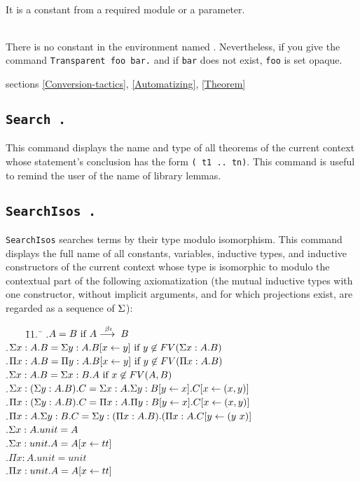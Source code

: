 \begin{ErrMsgs}
\item {}\\
    It is a constant from a required module or a parameter.
\item {\ident} \\
    There is no constant in the environment named
    \ident. Nevertheless, if you give the command \verb|Transparent foo bar.|
    and if \texttt{bar} does not exist, \texttt{foo} is set opaque.
\end{ErrMsgs}

\SeeAlso sections \ref{Conversion-tactics}, \ref{Automatizing},
\ref{Theorem}

\subsection{\tt Search {\ident}.}
This command displays the name and type of all theorems of the current
context whose statement's conclusion has the form {\tt ({\ident} t1 ..
  tn)}.  This command is useful to remind the user of the name of
library lemmas.

\subsection{\tt SearchIsos {\term}.}
\label{searchisos}
\texttt{SearchIsos} searches terms by their type modulo isomorphism.
This command displays the full name of all constants, variables,
inductive types, and inductive constructors of the current
context whose type is isomorphic to {\term} modulo the contextual part of the
following axiomatization (the mutual inductive types with one constructor,
without implicit arguments, and for which projections exist, are regarded as a
sequence of $\Sigma{}$):

\begin{tabbing}
\ \ \ \ \=11.\ \=\kill
{}.\>$A=B\mbox{ if }A\stackrel{\beta{}\iota{}}{\longrightarrow{}}B$\\
.\>$\Sigma{}x:A.B=\Sigma{}y:A.B[x\leftarrow{}y]\mbox{ if }y\not\in{}FV(\Sigma{}x:A.B)$\\
.\>$\Pi{}x:A.B=\Pi{}y:A.B[x\leftarrow{}y]\mbox{ if }y\not\in{}FV(\Pi{}x:A.B)$\\
.\>$\Sigma{}x:A.B=\Sigma{}x:B.A\mbox{ if }x\not\in{}FV(A,B)$\\
.\>$\Sigma{}x:(\Sigma{}y:A.B).C=\Sigma{}x:A.\Sigma{}y:B[y\leftarrow{}x].C[x\leftarrow{}(x,y)]$\\
.\>$\Pi{}x:(\Sigma{}y:A.B).C=\Pi{}x:A.\Pi{}y:B[y\leftarrow{}x].C[x\leftarrow{}(x,y)]$\\
.\>$\Pi{}x:A.\Sigma{}y:B.C=\Sigma{}y:(\Pi{}x:A.B).(\Pi{}x:A.C[y\leftarrow{}(y\mbox{ }{}x)]$\\
.\>$\Sigma{}x:A.unit=A$\\
.\>$\Sigma{}x:unit.A=A[x\leftarrow{}tt]$\\
.\>$\Pi{}x:A.unit=unit$\\
.\>$\Pi{}x:unit.A=A[x\leftarrow{}tt]$
\end{tabbing}


